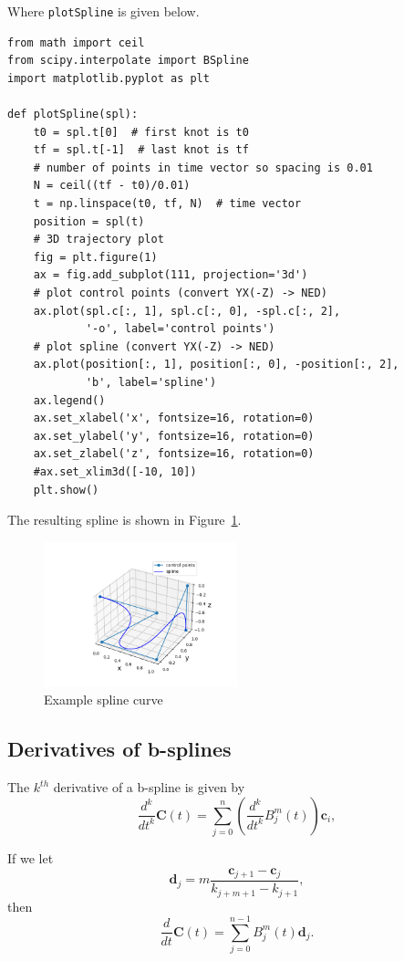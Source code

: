 \documentclass{article}
\begin{document}
Where {\tt plotSpline} is given below.
\begin{lstlisting}
from math import ceil
from scipy.interpolate import BSpline
import matplotlib.pyplot as plt

def plotSpline(spl):
    t0 = spl.t[0]  # first knot is t0
    tf = spl.t[-1]  # last knot is tf
    # number of points in time vector so spacing is 0.01
    N = ceil((tf - t0)/0.01)
    t = np.linspace(t0, tf, N)  # time vector
    position = spl(t)
    # 3D trajectory plot
    fig = plt.figure(1)
    ax = fig.add_subplot(111, projection='3d')
    # plot control points (convert YX(-Z) -> NED)
    ax.plot(spl.c[:, 1], spl.c[:, 0], -spl.c[:, 2],
            '-o', label='control points')
    # plot spline (convert YX(-Z) -> NED)
    ax.plot(position[:, 1], position[:, 0], -position[:, 2],
            'b', label='spline')
    ax.legend()
    ax.set_xlabel('x', fontsize=16, rotation=0)
    ax.set_ylabel('y', fontsize=16, rotation=0)
    ax.set_zlabel('z', fontsize=16, rotation=0)
    #ax.set_xlim3d([-10, 10])
    plt.show()
\end{lstlisting}

The resulting spline is shown in Figure~\ref{fig:example_spline_curve}.
\begin{figure}[hbt]
  \centering\includegraphics[width=0.5\textwidth]{./figures/example_spline_curve}
  \caption{Example spline curve}
  \label{fig:example_spline_curve}  
\end{figure}

\subsection{Derivatives of b-splines}
The $k^{th}$ derivative of a b-spline is given by
\[
\frac{d^k}{dt^k}\mathbf{C}(t) = \sum_{j=0}^n \left(\frac{d^k}{dt^k} B_j^m(t)\right) \mathbf{c}_i, 
\]


\par{}
If we let 
\[
\mathbf{d}_j = m \frac{\mathbf{c}_{j+1}-\mathbf{c}_j}{k_{j+m+1}-k_{j+1}},
\]
then
\[
\frac{d}{dt}\mathbf{C}(t) = \sum_{j=0}^{n-1} B_j^m(t) \mathbf{d}_j. 
\]
\end{document}
